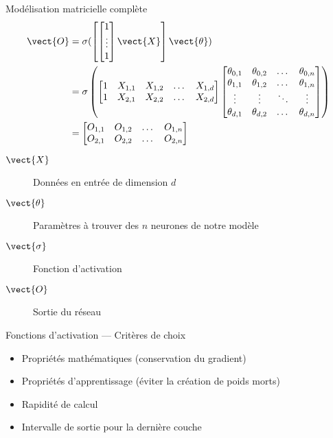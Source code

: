 \begin{frame}{Modélisation matricielle complète}
  \footnotesize
  \begin{align*}
    \vect{O} & = \sigma (\begin{bmatrix}\begin{bmatrix}1 \\ \vdots \\ 1\end{bmatrix}\vect{X}\end{bmatrix}\vect{\theta}) \\
    & = \sigma \left(
    \begin{bmatrix}
      1 & X_{1,1} & X_{1,2} & \dots & X_{1,d} \\
      1 & X_{2,1} & X_{2,2} & \dots & X_{2,d}
    \end{bmatrix}
    \begin{bmatrix}
      \theta_{0,1} & \theta_{0,2} & \dots  & \theta_{0,n} \\
      \theta_{1,1} & \theta_{1,2} & \dots  & \theta_{1,n} \\
      \vdots & \vdots & \ddots & \vdots \\
      \theta_{d,1} & \theta_{d,2} & \dots  & \theta_{d,n}
    \end{bmatrix}
    \right) \\
    & = \begin{bmatrix}
      O_{1,1} & O_{1,2} & \dots & O_{1,n} \\
      O_{2,1} & O_{2,2} & \dots & O_{2,n}
    \end{bmatrix}
  \end{align*}
  \begin{description}
    \item[$\vect{X}$] Données en entrée de dimension $d$
    \item[$\vect{\theta}$] Paramètres à trouver des $n$ neurones de notre modèle
    \item[$\vect{\sigma}$] Fonction d'activation
    \item[$\vect{O}$] Sortie du réseau
  \end{description}
\end{frame}

\begin{frame}{Fonctions d'activation --- Critères de choix}
  \begin{itemize}
    \item Propriétés mathématiques (conservation du gradient)
    \item Propriétés d'apprentissage (éviter la création de poids morts)
    \item Rapidité de calcul
    \item Intervalle de sortie pour la dernière couche
  \end{itemize}
\end{frame}

